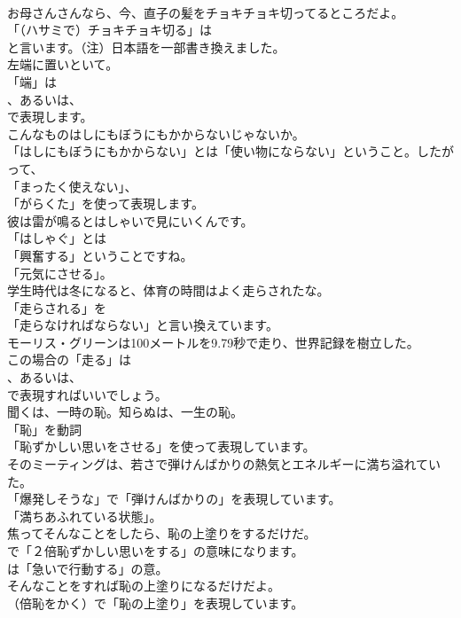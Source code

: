 \documentclass[8pt]{extreport}
\begin{document}
\begin{CJK}{UTF8}{min}
\\	お母さんさんなら、今、直子の髪をチョキチョキ切ってるところだよ。 
\\	「（ハサミで）チョキチョキ切る」は
\\	と言います。（注）日本語を一部書き換えました。	
\\	左端に置いといて。 
\\	「端」は
\\	、あるいは、
\\	で表現します。	
\\	こんなものはしにもぼうにもかからないじゃないか。 
\\	「はしにもぼうにもかからない」とは「使い物にならない」ということ。したがって、
\\	「まったく使えない」、
\\	「がらくた」を使って表現します。	
\\	彼は雷が鳴るとはしゃいで見にいくんです。 
\\	「はしゃぐ」とは
\\	「興奮する」ということですね。
\\	「元気にさせる」。	
\\	学生時代は冬になると、体育の時間はよく走らされたな。 
\\	「走らされる」を
\\	「走らなければならない」と言い換えています。	
\\	モーリス・グリーンは100メートルを9.79秒で走り、世界記録を樹立した。 
\\	この場合の「走る」は 
\\	、あるいは、
\\	で表現すればいいでしょう。	
\\	聞くは、一時の恥。知らぬは、一生の恥。 
\\	「恥」を動詞
\\	「恥ずかしい思いをさせる」を使って表現しています。	
\\	そのミーティングは、若さで弾けんばかりの熱気とエネルギーに満ち溢れていた。 
\\	「爆発しそうな」で「弾けんばかりの」を表現しています。
\\	「満ちあふれている状態」。	
\\	焦ってそんなことをしたら、恥の上塗りをするだけだ。 
\\	で「２倍恥ずかしい思いをする」の意味になります。
\\	は「急いで行動する」の意。	
\\	そんなことをすれば恥の上塗りになるだけだよ。 
\\	（倍恥をかく）で「恥の上塗り」を表現しています。

\end{CJK}
\end{document}
